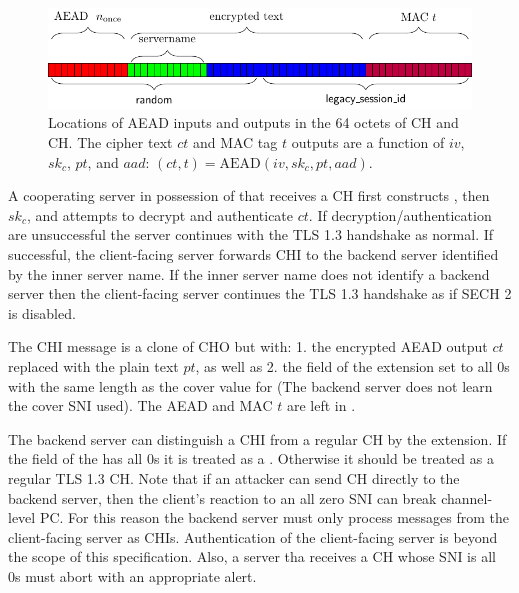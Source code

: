 \begin{figure}[htb]
\centering
\includegraphics[width=\linewidth]{figure/sech2-cover.pdf}
\captionsetup{width=.8\linewidth} 
\caption[SECH 2 Cover]{Locations of AEAD inputs and outputs in the 64 octets of \ac{CH} and \ac{CH}. The cipher text $ct$ and MAC tag $t$ outputs are a function of $iv$, $sk_c$, $pt$, and $aad$: $(ct,t)=\text{AEAD}(iv,sk_c,pt,aad)$.}
\label{fig:sech2-cover}
\end{figure}

A cooperating server in possession of \varsechlongtermkey{} that receives a \ac{CH}
first constructs , then $sk_c$,
and attempts to decrypt and authenticate $ct$.
If decryption/authentication are unsuccessful the server continues with the \ac{TLS} 1.3 handshake as normal.
If successful, the client-facing server forwards \ac{CHI} to the backend server identified by the inner server name.
If the inner server name does not identify a backend server then the client-facing server continues the \ac{TLS} 1.3 handshake as if \ac{SECH} 2 is disabled.

The \ac{CHI} message  is a clone of \ac{CHO} but with:
1. the encrypted AEAD output $ct$ replaced with the plain text $pt$, as well as
2. the  field of the  extension set to all 0s with the same length as the cover value for  (The backend server does not learn the cover \ac{SNI} used).
The \ac{AEAD} \nonce and \ac{MAC} $t$ are left in .

The backend server can distinguish a \ac{CHI}
from a regular \ac{CH} by the  extension.
If the  field of the  has all 0s it is treated as a .
Otherwise it should be treated as a regular \ac{TLS} 1.3 \ac{CH}.
Note that if an attacker can send \ac{CH} directly to
the backend server,
then the client's reaction to an all zero \ac{SNI} can break
channel-level \ac{PC}.
For this reason the backend server must only process messages
from the client-facing server as \ac{CHI}s.
Authentication of the client-facing server is beyond the scope of this specification.
Also, a server tha receives a \ac{CH} whose \ac{SNI} is all 0s must abort with an appropriate alert. %

